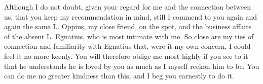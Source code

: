 

Although I do not doubt, given your regard for me and the connection between us, that you keep my recommendation in mind, still I commend to you again and again the same L. Oppius, my close friend, on the spot, and the business affairs of the absent L. Egnatius, who is most intimate with me. So close are my ties of connection and familiarity with Egnatius that, were it my own concern, I could feel it no more keenly. You will therefore oblige me most highly if you see to it that he understands he is loved by you as much as I myself reckon him to be. You can do me no greater kindness than this, and I beg you earnestly to do it.

